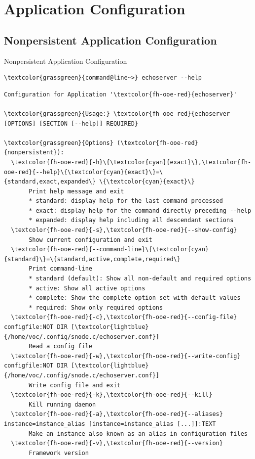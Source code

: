 ﻿\withsectionpage
\section{Application Configuration}
\nosectionpage
\subsection{Nonpersistent Application Configuration}

\begin{frame}[fragile]{Nonpersistent Application Configuration}
\begin{scriptsize}
\begin{Verbatim}[commandchars=\\\{\}]
\textcolor{grassgreen}{command@line~>} echoserver --help
\end{Verbatim}
\begin{Verbatim}[commandchars=\\\{\},frame=leftline,rulecolor=\color{fh-ooe-red}]
Configuration for Application '\textcolor{fh-ooe-red}{echoserver}'

\textcolor{grassgreen}{Usage:} \textcolor{fh-ooe-red}{echoserver [OPTIONS] [SECTION [--help]] REQUIRED}

\textcolor{grassgreen}{Options} (\textcolor{fh-ooe-red}{nonpersistent}):
  \textcolor{fh-ooe-red}{-h}\{\textcolor{cyan}{exact}\},\textcolor{fh-ooe-red}{--help}\{\textcolor{cyan}{exact}\}=\{standard,exact,expanded\} \{\textcolor{cyan}{exact}\}
       Print help message and exit
       * standard: display help for the last command processed
       * exact: display help for the command directly preceding --help
       * expanded: display help including all descendant sections
  \textcolor{fh-ooe-red}{-s},\textcolor{fh-ooe-red}{--show-config}
       Show current configuration and exit
  \textcolor{fh-ooe-red}{--command-line}\{\textcolor{cyan}{standard}\}=\{standard,active,complete,required\}
       Print command-line
       * standard (default): Show all non-default and required options
       * active: Show all active options
       * complete: Show the complete option set with default values
       * required: Show only required options
  \textcolor{fh-ooe-red}{-c},\textcolor{fh-ooe-red}{--config-file} configfile:NOT DIR [\textcolor{lightblue}{/home/voc/.config/snode.c/echoserver.conf}]
       Read a config file
  \textcolor{fh-ooe-red}{-w},\textcolor{fh-ooe-red}{--write-config} configfile:NOT DIR [\textcolor{lightblue}{/home/voc/.config/snode.c/echoserver.conf}]
       Write config file and exit
  \textcolor{fh-ooe-red}{-k},\textcolor{fh-ooe-red}{--kill}
       Kill running daemon
  \textcolor{fh-ooe-red}{-a},\textcolor{fh-ooe-red}{--aliases} instance=instance_alias [instance=instance_alias [...]]:TEXT
       Make an instance also known as an alias in configuration files
  \textcolor{fh-ooe-red}{-v},\textcolor{fh-ooe-red}{--version}
       Framework version
\end{Verbatim}
\end{scriptsize}
\end{frame}
